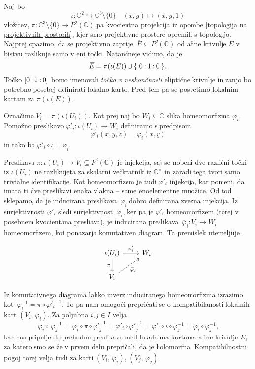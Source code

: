 \documentclass[mat1]{fmfdelo}
\numberwithin{equation}{section}
\newcommand{\C}{\mathbb C}
\newcommand{\CM}{\mathbb C ^\times}
\newcommand{\PC}{P^2(\mathbb C)}
\newcommand{\inv}{^{-1}}
\newcommand{\pcoor}[1]{%
\begingroup\lccode`~=`: \lowercase{\endgroup
\edef~}{\mathbin{\mathchar\the\mathcode`:}\nobreak}%
\left[%
\begingroup
\mathcode`:=\string"8000
#1%
\endgroup
\right]%
}
\newcommand{\olsi}[1]{\,\overline{\!{#1}}} %
\theoremstyle{definition}
\begin{document}
Naj bo 
\[
    \iota: \C^2 \hookrightarrow \C^3\setminus\{0\} \quad (x,y) \mapsto (x,y,1)
\]
vložitev, $\pi : \C^3 \setminus \{0\} \to \PC$ pa kvocientna projekcija iz opombe \ref{topologija na projektivnih prostorih}, kjer smo projektivne prostore opremili s topologijo. Najprej opazimo, da se projektivno zaprtje $\olsi{E} \subseteq \PC$ od afine krivulje $E$ v bistvu razlikuje samo v eni točki. Natančneje vidimo, da je 
\[
    \olsi{E} = \pi(\iota(E)) \cup \{\pcoor{0 : 1 : 0}\}.
\] 
Točko $\pcoor{0 : 1 : 0}$ bomo imenovali \emph{točka v neskončnosti} eliptične krivulje in zanjo bo potrebno posebej definirati lokalno karto. Pred tem pa se posvetimo lokalnim kartam za $\pi(\iota(E))$.

Označimo $V_i = \pi(\iota(U_i))$. Kot prej naj bo $W_i \subseteq \C$ slika homeomorfizma $\varphi_i$. Pomožno preslikavo $\varphi'_i : \iota(U_i) \to W_i$ definiramo s predpisom 
\[
    \varphi'_i(x,y,z) = \varphi_i(x,y)
\]
in tako bo $\varphi'_i \circ \iota = \varphi_i$.

Preslikava $\pi: \iota(U_i) \to V_i \subseteq \PC$ je injekcija, saj se nobeni dve različni točki iz $\iota(U_i)$ ne razlikujeta za skalarni večkratnik iz $\CM$ in zaradi tega tvori samo trivialne identifikacije. Kot homeomorfizem je tudi $\varphi'_i$ injekcija, kar pomeni, da imata ti dve preslikavi enaka vlakna -- same enoelementne množice. Od tod sklepamo, da je inducirana preslikava $\olsi{\varphi}_i$ dobro definirana zvezna injekcija. Iz surjektivnosti $\varphi'_i$ sledi surjektivnost $\olsi{\varphi}_i$, ker pa je $\varphi'_i$ homeomorfizem (torej v posebnem kvocientana presliava), je inducirana preslikava $\olsi{\varphi}_i : V_i \to W_i$ homeomorfizem, kot ponazarja komutativen diagram. Ta premislek utemeljuje \cite[Posledica 3.23]{MrcunTop}.

\begin{equation}
    \label{projektivna karta diagram}    
    \begin{tikzcd}
        \iota(U_i) \arrow{r}{\varphi'_i} \ar[labels=left]{d}{\pi} & W_i \\
        V_i \ar[dashed, labels=below right]{ur}{\olsi{\varphi}_i} 
    \end{tikzcd}
\end{equation}    


Iz komutativnega diagrama lahko inverz induciranega homeomorfizma izrazimo kot $\olsi{\varphi}_i\inv = \pi \circ {\varphi'_i}\inv$. To pa nam omogoči prepričati se o kompatibilanosti lokalnih kart $(V_i, \olsi{\varphi}_i)$.
Za poljubna $i,j \in I$ velja
\[
    \olsi{\varphi}_i \circ \olsi{\varphi}_j\inv = 
    \olsi{\varphi}_i \circ \pi \circ {\varphi'}_j\inv = 
    \varphi'_i \circ {\varphi'}_j\inv = 
    \varphi'_i \circ \iota \circ \varphi_j\inv = 
    \varphi_i \circ \varphi_j\inv,
\]
kar nas pripelje do prehodne preslikave med lokalnima kartama afine krivulje $E$, za katero smo se že v prvem delu prepričali, da je holomorfna. Kompatibilnostni pogoj torej velja tudi za karti $(V_i, \olsi{\varphi}_i)$, $(V_j, \olsi{\varphi}_j)$.
\end{document}
